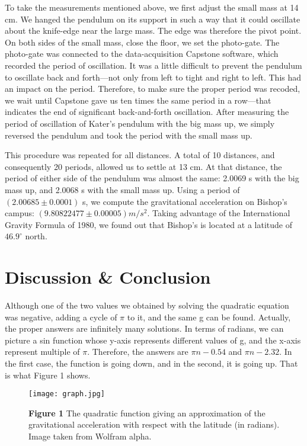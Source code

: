 \documentclass[12pt]{article}
\begin{document}
To take the measurements mentioned above, we first adjust the small mass at 14 cm. We hanged the pendulum on its support in such a way that it could oscillate about the knife-edge near the large mass. The edge was therefore the pivot point. On both sides of the small mass, close the floor, we set the photo-gate. The photo-gate was connected to the data-acquisition Capstone software, which recorded the period of oscillation. It was a little difficult to prevent the pendulum to oscillate back and forth—not only from left to tight and right to left. This had an impact on the period. Therefore, to make sure the proper period was recoded, we wait until Capstone gave us ten times the same period in a row—that indicates the end of significant back-and-forth oscillation. After measuring the period of oscillation of Kater’s pendulum with the big mass up, we simply reversed the pendulum and took the period with the small mass up.


This procedure was repeated for all distances. A total of 10 distances, and consequently 20 periods, allowed us to settle at 13 cm. At that distance, the period of either side of the pendulum was almost the same: 2.0069 s with the big mass up, and 2.0068 s with the small mass up. Using a period of $(2.00685 \pm 0.0001)$ s, we compute the gravitational acceleration on Bishop’s campus: $(9.80822477 \pm 0.00005) \si{m/s^2}$. Taking advantage of the International Gravity Formula of 1980, we found out that Bishop’s is located at a latitude of $46.9^\circ$ north.
\newpage
\section*{Discussion \& Conclusion}

Although one of the two values we obtained by solving the quadratic equation was negative, adding a cycle of $\pi$ to it, and the same g can be found. Actually, the proper answers are infinitely many solutions. In terms of radians, we can picture a sin function whose y-axis represents different values of g, and the x-axis represent multiple of $\pi$. Therefore, the answers are $\pi n - 0.54$ and $\pi n - 2.32$. In the first case, the function is going down, and in the second, it is going up. That is what Figure 1 shows. 


 \begin{figure}[ht!]
\centering
\texttt{[image: graph.jpg]}
\caption*{\footnotesize \textbf{Figure 1} The quadratic function giving an approximation of the gravitational acceleration with respect with the latitude (in radians).
Image taken from Wolfram alpha. \label{graph}}
\end{figure}
\end{document}
